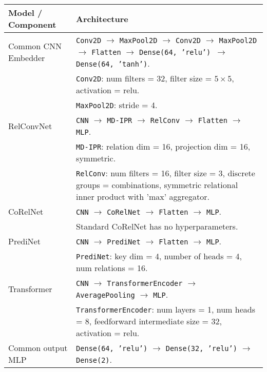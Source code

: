 \begin{tabular}{p{}p{}}
    \toprule
    Model / Component & Architecture                                                                                                                                                                                                                                                                                       \\ \midrule
    Common CNN \newline Embedder & \texttt{Conv2D} $\to$ \texttt{MaxPool2D} $\to$ \texttt{Conv2D} $\to$ \texttt{MaxPool2D} $\to$ \texttt{Flatten} $\to$ \texttt{Dense(64, 'relu') $\to$ \texttt{Dense(64, 'tanh')}}. \\
    & \texttt{Conv2D}: num filters = 32, filter size = $5 \times 5$, activation = relu. \\
    & \texttt{MaxPool2D}: stride = 4. \\\hline
    RelConvNet        & \texttt{CNN} $\to$ \texttt{MD-IPR} $\to$ \texttt{RelConv} $\to$ \texttt{Flatten} $\to$ \texttt{MLP}. \\
    & \texttt{MD-IPR}: relation dim = 16, projection dim = 16, symmetric. \\
    & \texttt{RelConv}: num filters = 16, filter size = 3, discrete groups = combinations, symmetric relational inner product with 'max' aggregator. \\\hline
    CoRelNet          & \texttt{CNN} $\to$ \texttt{CoRelNet} $\to$ \texttt{Flatten} $\to$ \texttt{MLP}. \\
    & Standard CoRelNet has no hyperparameters. \\\hline
    PrediNet          & \texttt{CNN} $\to$ \texttt{PrediNet} $\to$ \texttt{Flatten} $\to$ \texttt{MLP}. \\
    & \texttt{PrediNet}: key dim = 4, number of heads = 4, num relations = 16. \\\hline
    Transformer       & \texttt{CNN} $\to$ \texttt{TransformerEncoder} $\to$ \texttt{AveragePooling} $\to$ \texttt{MLP}. \\
    & \texttt{TransformerEncoder}: num layers = 1, num heads = 8, feedforward intermediate size = 32, activation = relu. \\\hline
    Common output MLP & \texttt{Dense(64, 'relu')} $\to$ \texttt{Dense(32, 'relu')} $\to$ \texttt{Dense(2)}. \\ \bottomrule
\end{tabular}